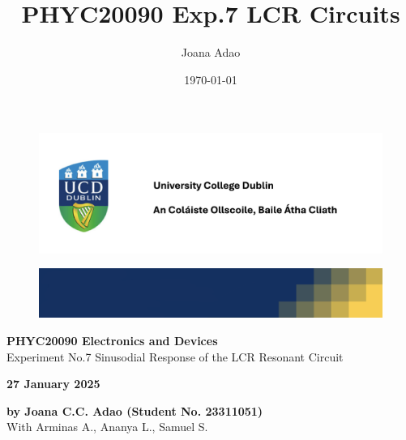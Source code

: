 \documentclass[12pt]{article}
\title{PHYC20090 Exp.7 LCR Circuits}
\author{Joana Adao}
\date{\today}
\begin{document}
\begin{titlepage}
    \begin{center}

        \begin{figure}[ht]
            \includegraphics[width=\textwidth]{UCDLogo.png}
        \end{figure}
        
        \begin{figure}
            \centerline{\includegraphics[width=\paperwidth]{UCDBanner.png}}
        \end{figure}

        \vspace{4cm}

        {\Huge \bfseries PHYC20090 Electronics and Devices}\\
        \vspace{0.75cm}
        {\LARGE Experiment No.7 Sinusodial Response of the LCR Resonant Circuit }
        
        \vspace{1cm}
    
    {\Large \textbf{27 January 2025 }}

    \vspace{2cm}
    
    {\large \textbf{by Joana C.C. Adao (Student No. 23311051)}}\\
    \medskip
    {\large With Arminas A., Ananya L., Samuel S.}

    \end{center}
    
   \clearpage

\end{titlepage}

\setcounter{page}{1}
\tableofcontents

\newpage
\end{document}
